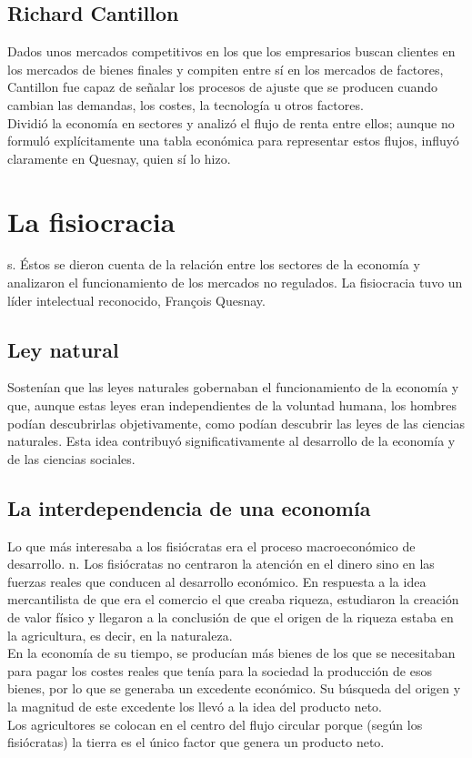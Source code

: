 \documentclass[10pt]{book}
\begin{document}
\subsection*{Richard Cantillon}
Dados unos mercados competitivos en los que los empresarios buscan clientes en los mercados de bienes finales y compiten entre sí en los mercados de factores, Cantillon fue capaz de señalar los procesos de ajuste que se producen cuando cambian las demandas, los costes, la tecnología u otros factores.\\
Dividió la economía en sectores y analizó el flujo de renta entre ellos; aunque no formuló explícitamente una tabla económica para representar estos flujos, influyó claramente en Quesnay, quien sí lo hizo.

\section*{La fisiocracia}
s. Éstos se dieron cuenta de la relación entre los sectores de la economía y analizaron el funcionamiento de los mercados no regulados. La fisiocracia tuvo un líder intelectual reconocido, François Quesnay.

    \subsection*{Ley natural}
    Sostenían que las leyes naturales gobernaban el funcionamiento de la economía y que, aunque estas leyes eran independientes de la voluntad humana, los hombres podían descubrirlas objetivamente, como podían descubrir las leyes de las ciencias naturales. Esta idea contribuyó significativamente al desarrollo de la economía y de las ciencias sociales.\\


    \subsection*{La interdependencia de una economía}
    Lo que más interesaba a los fisiócratas era el proceso macroeconómico de desarrollo. n. Los fisiócratas no centraron la atención en el dinero sino en las fuerzas reales que conducen al desarrollo económico. En respuesta a la idea mercantilista de que era el comercio el que creaba riqueza, estudiaron la creación de valor físico y llegaron a la conclusión de que el origen de la riqueza estaba en la agricultura, es decir, en la naturaleza.\\
    En la economía de su tiempo, se producían más bienes de los que se necesitaban para pagar los costes reales que tenía para la sociedad la producción de esos bienes, por lo que se generaba un excedente económico. Su búsqueda del origen y la magnitud de este excedente los llevó a la idea del producto neto.\\
    Los agricultores se colocan en el centro del flujo circular porque (según los fisiócratas) la tierra es el único factor que genera un producto neto.
\end{document}
